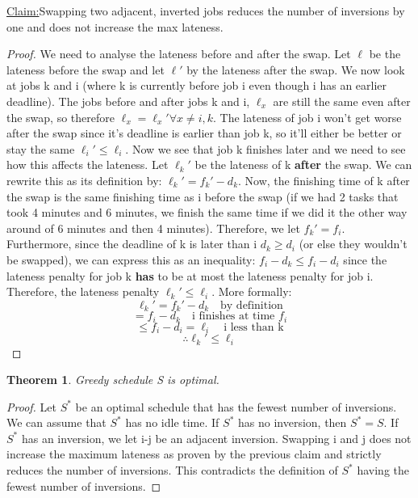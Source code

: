 \documentclass[11pt, oneside]{article}
\newtheorem{theorem}{Theorem}
\theoremstyle{definition}
\newenvironment{claim}[1]{\par\noindent\underline{Claim:}\space#1}{}
\begin{document}
\begin{claim}
  Swapping two adjacent, inverted jobs reduces the number of inversions by one and does not increase the max lateness.
\end{claim}
\begin{proof}
  We need to analyse the lateness before and after the swap. Let $\ell$ be the lateness before the swap and let $\ell'$ by the lateness after the swap. We now look at jobs k and i (where k is currently before job i even though i has an earlier deadline). The jobs before and after jobs k and i, $\ell_x$ are still the same even after the swap, so therefore $\ell_x = \ell_x' \forall x \neq i,k$. The lateness of job i won't get worse after the swap since it's deadline is earlier than job k, so it'll either be better or stay the same $\ell_i' \leq \ell_i$. Now we see that job k finishes later and we need to see how this affects the lateness. Let $\ell_k'$ be the lateness of k \textbf{after} the swap. We can rewrite this as its definition by: $\ell_k' = f_k' - d_k$. Now, the finishing time of k after the swap is the same finishing time as i before the swap (if we had 2 tasks that took 4 minutes and 6 minutes, we finish the same time if we did it the other way around of 6 minutes and then 4 minutes). Therefore, we let $f_k' = f_i$. Furthermore, since the deadline of k is later than i $d_k \geq d_i$ (or else they wouldn't be swapped), we can express this as an inequality: $f_i - d_k \leq f_i - d_i$ since the lateness penalty for job k \textbf{has} to be at most the lateness penalty for job i. Therefore, the lateness penalty $\ell_k' \leq \ell_i$. More formally:
  $$
  \ell_k' = f_k' - d_k \quad \text{by definition}
  $$
  $$
  = f_i - d_k \quad \text{i finishes at time }f_i
  $$
  $$
  \leq f_i - d_i = \ell_i \quad \text{i less than k}
  $$
  $$
  \therefore \ell_k' \leq \ell_i
  $$
\end{proof}

\begin{theorem}
  Greedy schedule S is optimal.
\end{theorem}

\begin{proof}
  Let $S^*$ be an optimal schedule that has the fewest number of inversions. We can assume that $S^*$ has no idle time. If $S^*$ has no inversion, then $S^* = S$. If $S^*$ has an inversion, we let i-j be an adjacent inversion. Swapping i and j does not increase the maximum lateness as proven by the previous claim and strictly reduces the number of inversions. This contradicts the definition of $S^*$ having the fewest number of inversions.
\end{proof}
\end{document}
